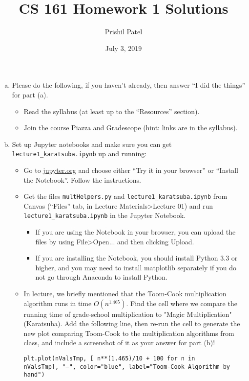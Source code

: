 \documentclass{article}
\title{CS 161 Homework 1 Solutions}
\author{Prishil Patel}
\date{July 3, 2019}
\begin{document}
\maketitle

\begin{exercise}[subtitle={Set-up (2 pts)}]
\begin{enumerate}[(a)]
\item Please do the following, if you haven't already, then answer ``I did the things'' for part (a).
	\begin{itemize}
	\item Read the syllabus (at least up to the ``Resources'' section).
	\item Join the course Piazza and Gradescope (hint: links are in the syllabus).
	\end{itemize}
\item Set up Jupyter notebooks and make sure you can get \texttt{lecture1\_karatsuba.ipynb} up and running:
	\begin{itemize}
	\item Go to \href{http://jupyter.org}{jupyter.org} and choose either ``Try it in your browser'' or ``Install the Notebook''. Follow the instructions.
	\item Get the files \texttt{multHelpers.py} and \texttt{lecture1\_karatsuba.ipynb} from Canvas (``Files'' tab, in Lecture Materials\textgreater Lecture 01) and run \texttt{lecture1\_karatsuba.ipynb} in the Jupyter Notebook.
		\begin{itemize}
		\item If you are using the Notebook in your browser, you can upload the files by using File\textgreater Open... and then clicking Upload.
		\item If you are installing the Notebook, you should install Python 3.3 or higher, and you may need to install matplotlib separately if you do not go through Anaconda to install Python.
		\end{itemize}
	\item In lecture, we briefly mentioned that the Toom-Cook multiplication algorithm runs in time $O(n^{1.465})$. Find the cell where we compare the running time of grade-school multiplication to "Magic Multiplication" (Karatsuba). Add the following line, then re-run the cell to generate the new plot comparing Toom-Cook to the multiplication algorithms from class, and include a screenshot of it as your answer for part (b)!
	
	\begin{flushright}
	\texttt{plt.plot(nValsTmp, [ n**(1.465)/10 + 100 for n in nValsTmp],~"--",~color="blue", label="Toom-Cook Algorithm by hand")}
	\end{flushright}
	\end{itemize}
\end{enumerate}
\end{exercise}
\end{document}
